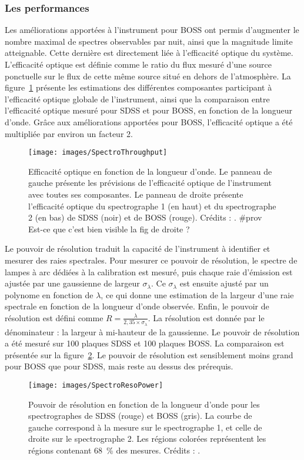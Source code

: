 \documentclass[11pt, twoside, a4paper, openright]{report}
\begin{document}
\subsubsection{Les performances}
Les améliorations apportées à l'instrument pour BOSS ont permis d'augmenter le nombre maximal de spectres observables par nuit, ainsi que la magnitude limite atteignable. Cette dernière est directement liée à l'efficacité optique du système. L'efficacité optique est définie comme le ratio du flux mesuré d'une source ponctuelle sur le flux de cette même source situé en dehors de l'atmosphère. La figure~\ref{fig:SpectroThroughput} présente les estimations des différentes composantes participant à l'efficacité optique globale de l'instrument, ainsi que la comparaison entre l'efficacité optique mesuré pour SDSS et pour BOSS, en fonction de la longueur d'onde. Grâce aux améliorations apportées pour BOSS, l'efficacité optique a été multipliée par environ un facteur 2.
\begin{figure}
  \centering
  \texttt{[image: images/SpectroThroughput]}
  \caption{Efficacité optique en fonction de la longueur d'onde. Le panneau de gauche présente les prévisions de l'efficacité optique de l'instrument avec toutes ses composantes. Le panneau de droite présente l'efficacité optique du spectrographe 1 (en haut) et du spectrographe 2 (en bas) de SDSS (noir) et de BOSS (rouge). Crédits : \cite{Smee2012}. \#prov Est-ce que c'est bien visible la fig de droite ?}
  \label{fig:SpectroThroughput}
\end{figure}

Le pouvoir de résolution traduit la capacité de l'instrument à identifier et mesurer des raies spectrales. Pour mesurer ce pouvoir de résolution, le spectre de lampes à arc dédiées à la calibration est mesuré, puis chaque raie d'émission est ajustée par une gaussienne de largeur $\sigma_\lambda$. Ce $\sigma_\lambda$ est ensuite ajusté par un polynome en fonction de $\lambda$, ce qui donne une estimation de la largeur d'une raie spectrale en fonction de la longueur d'onde observée. Enfin, le pouvoir de résolution est défini comme $R = \frac{\lambda}{2,35 \times \sigma_\lambda}$. La résolution est donnée par le dénominateur : la largeur à mi-hauteur de la gaussienne. Le pouvoir de résolution a été mesuré sur 100 plaques SDSS et 100 plaques BOSS. La comparaison est présentée sur la figure~\ref{fig:SpectroResoPower}. Le pouvoir de résolution est sensiblement moins grand pour BOSS que pour SDSS, mais reste au dessus des prérequis.
\begin{figure}
  \centering
  \texttt{[image: images/SpectroResoPower]}
  \caption{Pouvoir de résolution en fonction de la longueur d'onde pour les spectrographes de SDSS (rouge) et BOSS (gris). La courbe de gauche correspond à la mesure sur le spectrographe 1, et celle de droite sur le spectrographe 2. Les régions colorées représentent les régions contenant 68~\% des mesures. Crédits : \cite{Smee2012}.}
  \label{fig:SpectroResoPower}
\end{figure}
\end{document}
